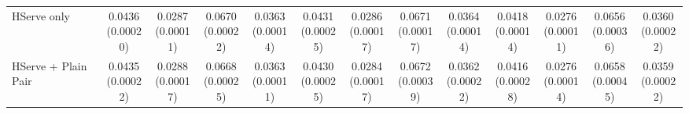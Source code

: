 \begin{table}[t]
\begin{tabular*}{\textwidth}{@{\extracolsep{\fill}} l *{12}{c} @{}}
HServe only & \shortstack[c]{0.0436\\[-1pt]{\tiny(0.00020)}} & \shortstack[c]{0.0287\\[-1pt]{\tiny(0.00011)}} & \shortstack[c]{0.0670\\[-1pt]{\tiny(0.00022)}} & \shortstack[c]{0.0363\\[-1pt]{\tiny(0.00014)}} & \shortstack[c]{0.0431\\[-1pt]{\tiny(0.00025)}} & \shortstack[c]{0.0286\\[-1pt]{\tiny(0.00017)}} & \shortstack[c]{0.0671\\[-1pt]{\tiny(0.00017)}} & \shortstack[c]{0.0364\\[-1pt]{\tiny(0.00014)}} & \shortstack[c]{0.0418\\[-1pt]{\tiny(0.00014)}} & \shortstack[c]{0.0276\\[-1pt]{\tiny(0.00011)}} & \shortstack[c]{0.0656\\[-1pt]{\tiny(0.00036)}} & \shortstack[c]{0.0360\\[-1pt]{\tiny(0.00022)}} \\
\addlinespace[1pt]
HServe + Plain Pair & \shortstack[c]{0.0435\\[-1pt]{\tiny(0.00022)}} & \shortstack[c]{0.0288\\[-1pt]{\tiny(0.00017)}} & \shortstack[c]{0.0668\\[-1pt]{\tiny(0.00025)}} & \shortstack[c]{0.0363\\[-1pt]{\tiny(0.00011)}} & \shortstack[c]{0.0430\\[-1pt]{\tiny(0.00025)}} & \shortstack[c]{0.0284\\[-1pt]{\tiny(0.00017)}} & \shortstack[c]{0.0672\\[-1pt]{\tiny(0.00039)}} & \shortstack[c]{0.0362\\[-1pt]{\tiny(0.00022)}} & \shortstack[c]{0.0416\\[-1pt]{\tiny(0.00028)}} & \shortstack[c]{0.0276\\[-1pt]{\tiny(0.00014)}} & \shortstack[c]{0.0658\\[-1pt]{\tiny(0.00045)}} & \shortstack[c]{0.0359\\[-1pt]{\tiny(0.00022)}} \\

\end{tabular*}
\end{table}
